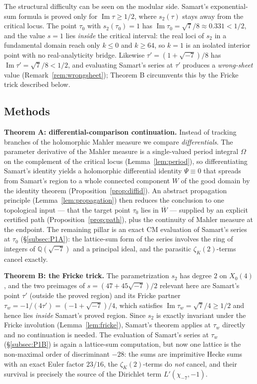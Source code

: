 \documentclass[11pt]{article}
\theoremstyle{definition}
\theoremstyle{remark}
\newcommand{\Qq}{\mathbb{Q}}
\newcommand{\ImT}{\operatorname{Im}}
\begin{document}
The structural difficulty can be seen on the modular side. Samart's
exponential-sum formula is proved only for $\ImT\tau\ge1/2$, where
$s_2(\tau)$ stays away from the critical locus. The point $\tau_0$ with
$s_2(\tau_0)=1$ has $\ImT\tau_0=\sqrt7/8\approx0.331<1/2$, and the value
$s=1$ lies \emph{inside} the critical interval: the real loci of $s_2$ in
a fundamental domain reach only $k\le0$ and $k\ge64$, so $k=1$ is an
isolated interior point with no real-analyticity bridge. Likewise
$\tau'=(1+\sqrt{-7})/8$ has $\ImT\tau'=\sqrt7/8<1/2$, and evaluating
Samart's series at $\tau'$ produces a \emph{wrong-sheet} value
(Remark~\ref{rem:wrongsheet}); Theorem B circumvents this by the Fricke
trick described below.

\subsection{Methods}\label{subsec:methods}

\textbf{Theorem A: differential-comparison continuation.}
Instead of tracking branches of the holomorphic Mahler measure we compare
\emph{differentials}. The parameter derivative of the Mahler measure is a
single-valued period integral $\Omega$ on the complement of the critical
locus (Lemma~\ref{lem:period}), so differentiating Samart's identity
yields a holomorphic differential identity $\Psi\equiv0$ that spreads from
Samart's region to a whole connected component $W$ of the good domain by
the identity theorem (Proposition~\ref{prop:diffid}). An abstract
propagation principle (Lemma~\ref{lem:propagation}) then reduces the
conclusion to one topological input --- that the target point $\tau_0$
lies in $\overline W$ --- supplied by an explicit certified path
(Proposition~\ref{prop:path}), plus the continuity of Mahler measure at
the endpoint. The remaining pillar is an exact CM evaluation of Samart's
series at $\tau_0$ (\S\ref{subsec:P1A}): the lattice-sum form of the
series involves the ring of integers of $\Qq(\sqrt{-7})$ and a principal
ideal, and the parasitic $\zeta_K(2)$-terms cancel exactly.

\textbf{Theorem B: the Fricke trick.}
The parametrization $s_2$ has degree $2$ on $X_0(4)$, and the two
preimages of $s=(47+45\sqrt{-7})/2$ relevant here are Samart's point
$\tau'$ (outside the proved region) and its Fricke partner
$\tau_w=-1/(4\tau')=(-1+\sqrt{-7})/4$, which satisfies
$\ImT\tau_w=\sqrt7/4\ge1/2$ and hence lies \emph{inside} Samart's proved
region. Since $s_2$ is exactly invariant under the Fricke involution
(Lemma~\ref{lem:fricke}), Samart's theorem applies at $\tau_w$ directly
and no continuation is needed. The evaluation of Samart's series at
$\tau_w$ (\S\ref{subsec:P1B}) is again a lattice-sum computation, but
now one lattice is the non-maximal order of discriminant $-28$: the sums
are imprimitive Hecke sums with an exact Euler factor $23/16$, the
$\zeta_K(2)$-terms do \emph{not} cancel, and their survival is precisely
the source of the Dirichlet term $L'(\chi_{-7},-1)$.
\end{document}
